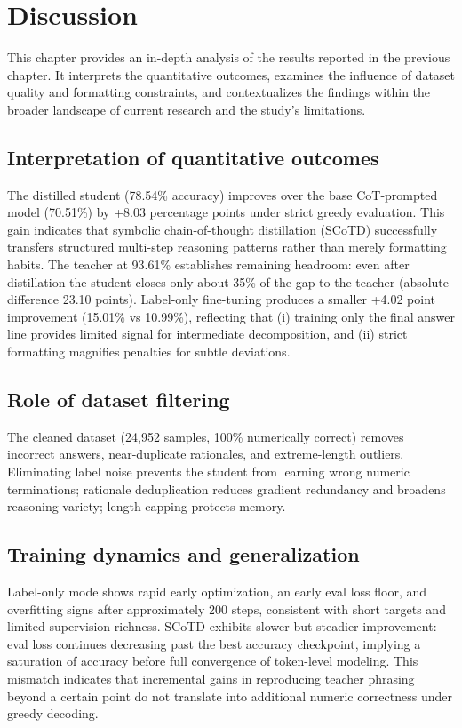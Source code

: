 \chapter{Discussion}

This chapter provides an in-depth analysis of the results reported in the previous chapter. It interprets the quantitative outcomes, examines the influence of dataset quality and formatting constraints, and contextualizes the findings within the broader landscape of current research and the study's limitations.

\section{Interpretation of quantitative outcomes}
The distilled student (78.54\% accuracy) improves over the base CoT-prompted model (70.51\%) by +8.03 percentage points under strict greedy evaluation. This gain indicates that symbolic chain-of-thought distillation (SCoTD) successfully transfers structured multi-step reasoning patterns rather than merely formatting habits. The teacher at 93.61\% establishes remaining headroom: even after distillation the student closes only about 35\% of the gap to the teacher (absolute difference 23.10 points). Label-only fine-tuning produces a smaller +4.02 point improvement (15.01\% vs 10.99\%), reflecting that (i) training only the final answer line provides limited signal for intermediate decomposition, and (ii) strict formatting magnifies penalties for subtle deviations.

\section{Role of dataset filtering}
The cleaned dataset (24{,}952 samples, 100\% numerically correct) removes incorrect answers, near-duplicate rationales, and extreme-length outliers. Eliminating label noise prevents the student from learning wrong numeric terminations; rationale deduplication reduces gradient redundancy and broadens reasoning variety; length capping protects memory.

\section{Training dynamics and generalization}
Label-only mode shows rapid early optimization, an early eval loss floor, and overfitting signs after approximately 200 steps, consistent with short targets and limited supervision richness. SCoTD exhibits slower but steadier improvement: eval loss continues decreasing past the best accuracy checkpoint, implying a saturation of accuracy before full convergence of token-level modeling. This mismatch indicates that incremental gains in reproducing teacher phrasing beyond a certain point do not translate into additional numeric correctness under greedy decoding.

